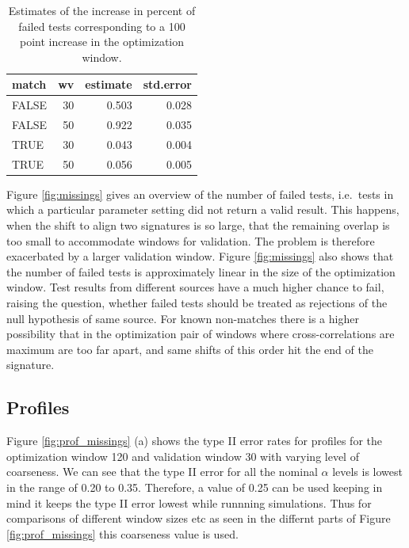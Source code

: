 \documentclass[12pt]{article}
\begin{document}
\begin{table}

\caption{\label{tab:lms}Estimates of the increase in percent of failed tests corresponding to a 100 point increase in the optimization window.}
\centering
\begin{tabular}[t]{lrrr}
\toprule
match & wv & estimate & std.error\\
\midrule
FALSE & 30 & 0.503 & 0.028\\
FALSE & 50 & 0.922 & 0.035\\
TRUE & 30 & 0.043 & 0.004\\
TRUE & 50 & 0.056 & 0.005\\
\bottomrule
\end{tabular}
\end{table}

Figure \ref{fig:missings} gives an overview of the number of failed
tests, i.e.~tests in which a particular parameter setting did not return
a valid result. This happens, when the shift to align two signatures is
so large, that the remaining overlap is too small to accommodate windows
for validation. The problem is therefore exacerbated by a larger
validation window. Figure \ref{fig:missings} also shows that the number
of failed tests is approximately linear in the size of the optimization
window. Test results from different sources have a much higher chance to
fail, raising the question, whether failed tests should be treated as
rejections of the null hypothesis of same source. For known non-matches
there is a higher possibility that in the optimization pair of windows
where cross-correlations are maximum are too far apart, and same shifts
of this order hit the end of the signature.

\subsection{Profiles}\label{profiles-1}

Figure \ref{fig:prof_missings} (a) shows the type II error rates for
profiles for the optimization window 120 and validation window 30 with
varying level of coarseness. We can see that the type II error for all
the nominal \(\alpha\) levels is lowest in the range of 0.20 to 0.35.
Therefore, a value of 0.25 can be used keeping in mind it keeps the type
II error lowest while runnning simulations. Thus for comparisons of
different window sizes etc as seen in the differnt parts of Figure
\ref{fig:prof_missings} this coarseness value is used.
\end{document}
